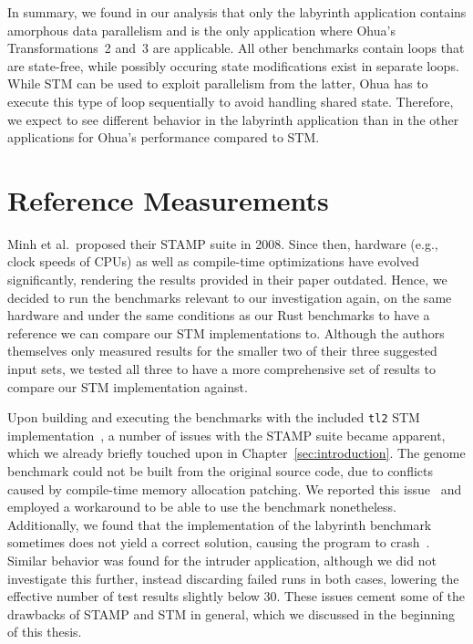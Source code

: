 In summary, we found in our analysis that only the labyrinth application contains amorphous data parallelism and is the only application where Ohua's Transformations~2 and~3 are applicable.
All other benchmarks contain loops that are state-free, while possibly occuring state modifications exist in separate loops.
While STM can be used to exploit parallelism from the latter, Ohua has to execute this type of loop sequentially to avoid handling shared state.
Therefore, we expect to see different behavior in the labyrinth application than in the other applications for Ohua's performance compared to STM.

\section{Reference Measurements}
\label{sec:experiments:reference}

Minh et al.\ proposed their STAMP suite in 2008.
Since then, hardware (e.g., clock speeds of CPUs) as well as compile-time optimizations have evolved significantly, rendering the results provided in their paper outdated.
Hence, we decided to run the benchmarks relevant to our investigation again, on the same hardware and under the same conditions as our Rust benchmarks to have a reference we can compare our STM implementations to.
Although the authors themselves only measured results for the smaller two of their three suggested input sets, we tested all three to have a more comprehensive set of results to compare our STM implementation against.

Upon building and executing the benchmarks with the included \texttt{tl2} STM implementation~\cite{minh2013stampcode}, a number of issues with the STAMP suite became apparent, which we already briefly touched upon in Chapter~\ref{sec:introduction}.
The genome benchmark could not be built from the original source code, due to conflicts caused by compile-time memory allocation patching.
We reported this issue~\cite{wittwer2020stampgenome} and employed a workaround to be able to use the benchmark nonetheless.
Additionally, we found that the implementation of the labyrinth benchmark sometimes does not yield a correct solution, causing the program to crash~\cite{wittwer2020labyrinth}.
Similar behavior was found for the intruder application, although we did not investigate this further, instead discarding failed runs in both cases, lowering the effective number of test results slightly below 30.
These issues cement some of the drawbacks of STAMP and STM in general, which we discussed in the beginning of this thesis.

